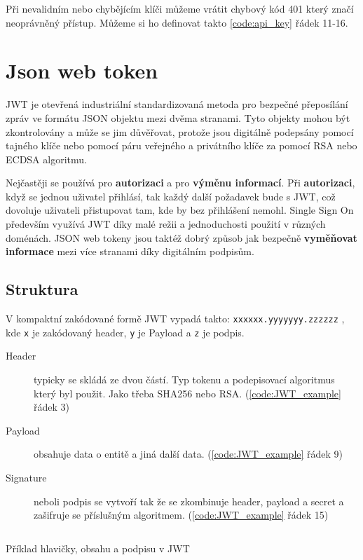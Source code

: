 Při nevalidním nebo chybějícím klíči můžeme vrátit chybový kód 401 který značí neoprávněný přístup. Můžeme si ho definovat takto \ref{code:api_key} řádek 11-16.


\section{Json web token} %
JWT je otevřená industriální standardizovaná %
metoda pro bezpečné přeposílání zpráv ve formátu JSON objektu mezi dvěma stranami.
Tyto objekty mohou být zkontrolovány a může se jim důvěřovat, protože jsou digitálně podepsány pomocí tajného klíče nebo pomocí páru veřejného a privátního klíče za pomocí RSA nebo ECDSA algoritmu.

Nejčastěji se používá pro \textbf{autorizaci} a pro \textbf{výměnu informací}. Při \textbf{autorizaci}, když se jednou uživatel přihlásí, tak každý další požadavek bude s JWT, což dovoluje uživateli přistupovat tam, kde by bez přihlášení nemohl. Single Sign On
především využívá JWT díky malé režii a jednoduchosti použití v různých doménách. JSON web tokeny jsou taktéž dobrý způsob jak bezpečně \textbf{vyměňovat informace} mezi více stranami díky digitálním podpisům.

\subsection{Struktura}
V kompaktní zakódované formě JWT vypadá takto: \texttt{xxxxxx.yyyyyyy.zzzzzz} , kde \texttt{x} je zakódovaný header, \texttt{y} je Payload a \texttt{z} je podpis.

\begin{description}
    \item[Header] typicky se skládá ze dvou částí. Typ tokenu a podepisovací algoritmus který byl použit. Jako třeba SHA256 nebo RSA. (\ref{code:JWT_example} řádek 3)
    \item[Payload] obsahuje data o entitě a jiná další data. (\ref{code:JWT_example} řádek 9)
    \item[Signature] neboli podpis se vytvoří tak že se zkombinuje header, payload a secret a zašifruje se příslušným algoritmem. (\ref{code:JWT_example} řádek 15)
\end{description}

\begin{listing}[ht]
    \inputminted[]{json}{resources/code/security/JWT.jsonc}
    \caption{Příklad hlavičky, obsahu a podpisu v JWT} %
    \label{code:JWT_example}
\end{listing}






